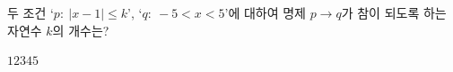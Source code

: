 두 조건 `$p:\ |x-1|\le k$', `$q:\ -5<x<5$'에 대하여 명제 $p\longrightarrow q$가 참이 되도록 하는 자연수 $k$의 개수는?
\begin{choices32}{$1$}{$2$}{$3$}{$4$}{$5$}\end{choices32}
